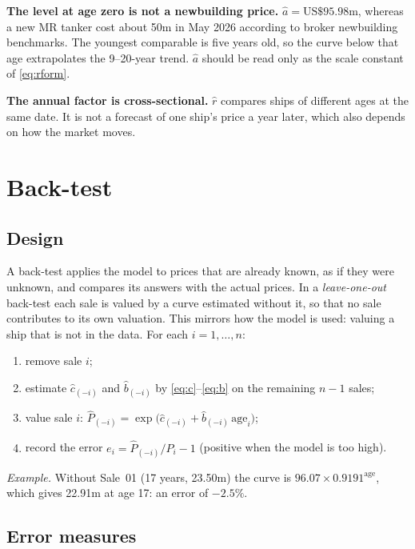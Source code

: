 \documentclass[11pt,a4paper]{article}
\newcommand{\usd}[1]{\text{US\$}#1}
\newcommand{\age}{\mathrm{age}}
\begin{document}
\textbf{The level at age zero is not a newbuilding price.} $\hat a = \usd{95.98}$m, whereas a new MR tanker cost about \usd{50}m in May 2026 according to broker newbuilding benchmarks. The youngest comparable is five years old, so the curve below that age extrapolates the 9--20-year trend. $\hat a$ should be read only as the scale constant of \eqref{eq:rform}.

\textbf{The annual factor is cross-sectional.} $\hat r$ compares ships of different ages at the same date. It is not a forecast of one ship's price a year later, which also depends on how the market moves.

\section{Back-test}

\subsection{Design}

A back-test applies the model to prices that are already known, as if they were unknown, and compares its answers with the actual prices.
In a \emph{leave-one-out} back-test each sale is valued by a curve estimated without it, so that no sale contributes to its own valuation. This mirrors how the model is used: valuing a ship that is not in the data. For each $i = 1, \dots, n$:
\begin{enumerate}
\item remove sale $i$;
\item estimate $\hat c_{(-i)}$ and $\hat b_{(-i)}$ by \eqref{eq:c}--\eqref{eq:b} on the remaining $n-1$ sales;
\item value sale $i$: $\hat P_{(-i)} = \exp\bigl(\hat c_{(-i)} + \hat b_{(-i)}\,\age_i\bigr)$;
\item record the error $e_i = \hat P_{(-i)}/P_i - 1$ (positive when the model is too high).
\end{enumerate}

\emph{Example.} Without Sale~01 (17 years, \usd{23.50}m) the curve is $96.07 \times 0.9191^{\age}$, which gives \usd{22.91}m at age 17: an error of $-2.5\%$.

\subsection{Error measures}
\end{document}

